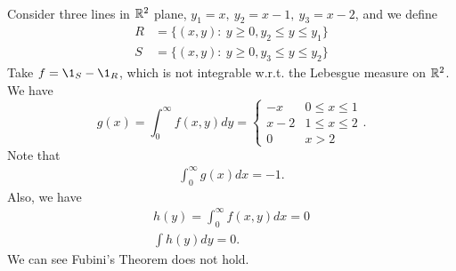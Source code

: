 \vspace{6pt}
\begin{example}\ \\
    Consider three lines in $\mathbb{R}^2$ plane, $y_1 = x,\ y_2 = x - 1,\ y_3 = x - 2$, and we define 
    \begin{align*}
        R &= \{(x,y):\ y \geq 0, y_2 \leq y \leq y_1 \}\\
        S &= \{(x,y):\ y \geq 0, y_3 \leq y \leq y_2 \}
    \end{align*}
    Take $f = \1_S - \1_R$, which is not integrable w.r.t. the Lebesgue measure on $\mathbb{R}^2$. We have
    \begin{equation*}
        g(x) = \int_0^\infty f(x,y) d y = \left\{\begin{matrix}
-x & 0 \leq x \leq 1 \\ 
x - 2 & 1 \leq x \leq 2\\ 
0 & x > 2
\end{matrix}\right..
    \end{equation*}
    Note that
    \begin{align*}
        \int_0^\infty g(x) dx = -1.
    \end{align*}
    Also, we have
    \begin{align*}
        h(y) = \int_0^\infty f(x,y) dx = 0\\
        \int h(y) dy = 0.
    \end{align*}
    We can see Fubini's Theorem does not hold.
\end{example}














